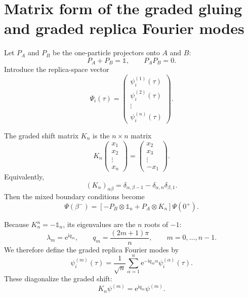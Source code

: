 \documentclass[11pt]{article}
\newcommand{\e}{\mathrm{e}}
\newcommand{\ii}{\mathrm{i}}
\newcommand{\1}{\mathds{1}}
\newcommand{\sq}[1]{\left[#1\right]}
\begin{document}
\section{Matrix form of the graded gluing and graded replica Fourier modes}

Let $P_A$ and $P_B$ be the one-particle projectors onto $A$ and $B$:
\begin{equation}
P_A+P_B=\1,
\qquad
P_A P_B=0.
\label{eq:AB-projectors}
\end{equation}
Introduce the replica-space vector
\begin{equation}
\Psi_i(\tau)
=
\begin{pmatrix}
\psi_i^{(1)}(\tau)\\
\psi_i^{(2)}(\tau)\\
\vdots\\
\psi_i^{(n)}(\tau)
\end{pmatrix}.
\label{eq:replica-vector}
\end{equation}

The graded shift matrix $K_n$ is the $n\times n$ matrix
\begin{equation}
K_n
\begin{pmatrix}
x_1\\x_2\\ \vdots\\ x_n
\end{pmatrix}
=
\begin{pmatrix}
x_2\\x_3\\ \vdots\\ -x_1
\end{pmatrix}.
\label{eq:graded-shift-action}
\end{equation}
Equivalently,
\begin{equation}
(K_n)_{\alpha\beta}
=
\delta_{\alpha,\beta-1}
-\delta_{\alpha,n}\delta_{\beta,1}.
\label{eq:graded-shift-matrix}
\end{equation}
Then the mixed boundary conditions become
\begin{equation}
\Psi(\beta^-)
=
\sq{
-P_B\otimes \1_n
+
P_A\otimes K_n
}\Psi(0^+).
\label{eq:matrix-bc-graded}
\end{equation}

Because $K_n^n=-\1_n$, its eigenvalues are the $n$ roots of $-1$:
\begin{equation}
\lambda_m=\e^{\ii q_m},
\qquad
q_m=\frac{(2m+1)\pi}{n},
\qquad
m=0,\dots,n-1.
\label{eq:graded-eigs}
\end{equation}
We therefore define the graded replica Fourier modes by
\begin{equation}
\psi_i^{(m)}(\tau)
=
\frac{1}{\sqrt n}
\sum_{\alpha=1}^n
\e^{-\ii q_m \alpha}\psi_i^{(\alpha)}(\tau).
\label{eq:graded-replica-FT}
\end{equation}
These diagonalize the graded shift:
\begin{equation}
K_n \psi^{(m)} = \e^{\ii q_m}\psi^{(m)}.
\label{eq:K-eigenvalue}
\end{equation}
\end{document}
